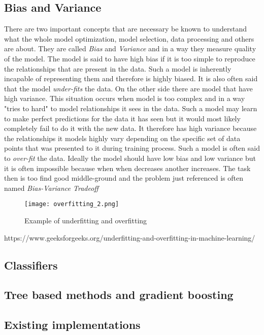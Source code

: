 \documentclass[a4paper,twoside,12pt]{book}
\begin{document}
\subsection{Bias and Variance}

There are two important concepts that are necessary be known to understand what the whole model optimization, model selection, data processing and others are about. They are called \emph{Bias} and \emph{Variance} and in a way they measure quality of the model.
The model is said to have high bias if it is too simple to reproduce the relationships that are present in the data. Such a model is inherently incapable of representing them and therefore is highly biased. It is also often said that the model \emph{under-fits} the data. On the other side there are model that have high variance. This situation occurs when model is too complex and in a way "tries to hard" to model relationships it sees in the data. Such a model may learn to make perfect predictions for the data it has seen but it would most likely completely fail to do it with the new data. It therefore has high variance because the relationships it models highly vary depending on the specific set of data points that was presented to it during training process. Such a model is often said to \emph{over-fit} the data.
Ideally the model should have low bias and low variance but it is often impossible because when when decreases another increases. The task then is too find good middle-ground and the problem just referenced is often named \emph{Bias-Variance Tradeoff}

\begin{figure}[h]
    \centering
    \texttt{[image: overfitting\_2.png]}
    \caption{Example of underfitting and overfitting}
    \label{fig:mesh1}
\end{figure}

https://www.geeksforgeeks.org/underfitting-and-overfitting-in-machine-learning/

\subsection{Classifiers}



\subsection{Tree based methods and gradient boosting}


\subsection{Existing implementations}
\end{document}
